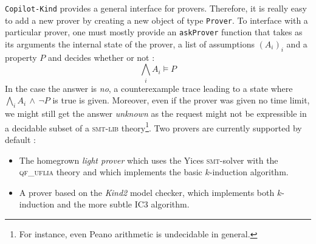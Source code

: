  \texttt{Copilot-Kind} provides a general interface for
provers. Therefore, it is really easy to add a new prover by creating a
new object of type \texttt{Prover}. 
%
%
%  
%
%
To interface with a particular prover, one must mostly provide an \texttt{askProver} function that
takes as its arguments the internal state of the prover, a list of assumptions $(A_i)_i$ and a property $P$ and decides whether or not : \[ \bigwedge_i A_i \models P  \] In the case the answer is \emph{no}, a counterexample trace leading to a state where $\bigwedge_i A_i \,\wedge\, \neg P$ is true is given. Moreover, even if the prover was given no time limit, we might still get the answer \emph{unknown} as the request might not be expressible in a decidable subset of a \textsc{smt-lib} theory\footnote{For instance, even Peano arithmetic is undecidable in general.}.
Two provers are currently supported by default :
\begin{itemize}
\item The homegrown \emph{light prover} which uses the Yices \textsc{smt}-solver with the \textsc{qf\_uflia} theory and which implements the basic $k$-induction algorithm.
\item A prover based on the \emph{Kind2} model checker, which implements both $k$-induction and the more subtle IC3 algorithm.
\end{itemize}


